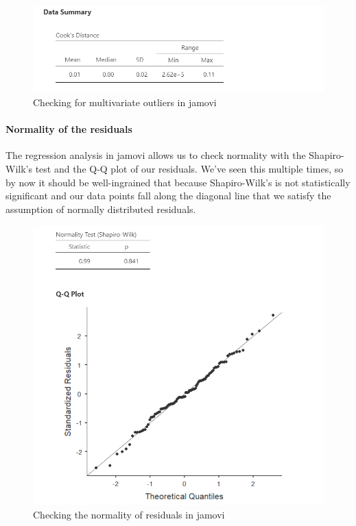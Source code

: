 \documentclass[
]{book}
\begin{document}
\begin{figure}

{\centering \includegraphics[width=1\linewidth]{images/13-regression/regression-cooks} 

}

\caption{Checking for multivariate outliers in jamovi}\label{fig:unnamed-chunk-5}
\end{figure}

\hypertarget{normality-of-the-residuals}{%
\paragraph{Normality of the residuals}\label{normality-of-the-residuals}}

The regression analysis in jamovi allows us to check normality with the Shapiro-Wilk's test and the Q-Q plot of our residuals. We've seen this multiple times, so by now it should be well-ingrained that because Shapiro-Wilk's is not statistically significant and our data points fall along the diagonal line that we satisfy the assumption of normally distributed residuals.

\begin{figure}

{\centering \includegraphics[width=1\linewidth]{images/13-regression/regression-normality} 

}

\caption{Checking the normality of residuals in jamovi}\label{fig:unnamed-chunk-6}
\end{figure}
\end{document}
